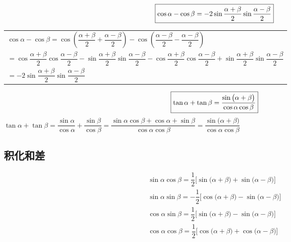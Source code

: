 \begin{equation}
	\boxed{\cos \alpha - \cos \beta = - 2 \sin \dfrac{\alpha + \beta}{2}\sin \dfrac{\alpha- \beta}{2}}
	\vspace*{0.5em}
\end{equation}
\begin{tabular}{l}
	\proof \quad $\displaystyle \cos \alpha - \cos \beta = \cos \left( \dfrac{\alpha + \beta }{2} + \dfrac{\alpha - \beta}{2}\right) - \cos \left( \dfrac{\alpha - \beta}{2} - \dfrac{\alpha - \beta}{2} \right)$ \\[-1em]
	$=\cos \dfrac{\alpha + \beta}{2} \cos \dfrac{\alpha - \beta}{2} - \sin \dfrac{\alpha + \beta}{2}\sin \dfrac{\alpha - \beta}{2} - \cos \dfrac{\alpha + \beta}{2} \cos\dfrac{\alpha - \beta}{2} + \sin \dfrac{\alpha + \beta}{2} \sin \dfrac{\alpha - \beta}{2}$\\
	$= - 2 \sin \dfrac{\alpha + \beta}{2} \sin \dfrac{\alpha - \beta}{2}$
\end{tabular}

\begin{equation}
	\boxed{\tan \alpha + \tan \beta = \dfrac{\sin \big(\alpha + \beta \big)}{\cos \alpha \cos \beta} }
	\vspace*{0.5em}
\end{equation}
\quad \proof \quad $\displaystyle \tan \alpha + \tan \beta = \dfrac{\sin \alpha}{\cos \alpha} + \dfrac{\sin \beta}{\cos \beta} = \dfrac{\sin \alpha \cos \beta + \cos \alpha + \sin \beta}{\cos \alpha \cos \beta} = \dfrac{\sin \big( \alpha + \beta)}{\cos \alpha \cos \beta}$


\subsection{积化和差}
\vspace*{-1em}
\begin{align}
	\boxed{\sin \alpha \cos \beta = \dfrac 1 2 \Big[\sin \big( \alpha + \beta \big) + \sin \big( \alpha - \beta \big) \Big]} \\[0.5em]
	\boxed{\sin \alpha \sin \beta = -\dfrac 1 2 \Big[\cos \big(\alpha + \beta \big) - \sin \big( \alpha - \beta \big) \Big]} \\[0.5em]
	\boxed{\cos \alpha \sin \beta = \dfrac 1 2 \Big[\sin \big( \alpha + \beta \big) - \sin \big( \alpha - \beta \big) \Big]} \\[0.5em]
	\boxed{\cos \alpha \cos \beta = \dfrac 1 2 \Big[\cos \big(\alpha + \beta \big) + \cos \big( \alpha - \beta \big) \Big]}
\end{align}

